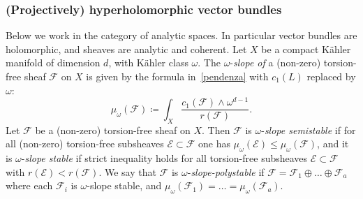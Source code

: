 \documentclass[11pt]{amsart}
\let\mathcal\mathscr
\def\cE{\mathcal{E}}
\def\cF{\mathcal{F}}
\theoremstyle{definition}
\theoremstyle{remark}
\begin{document}
\subsubsection{(Projectively) hyperholomorphic vector bundles}\label{subsubsec:iperolom}
%
Below we work in the category of analytic spaces. In particular vector bundles are holomorphic, and sheaves are analytic and coherent. 
Let $X$ be a compact K\"ahler  manifold of dimension $d$, with K\"ahler class $\omega$.  The $\omega$-\emph{slope of} a (non-zero) torsion-free sheaf 
$\cF$ on $X$
 is given by the formula in~\eqref{pendenza} with $c_1(L)$ replaced by $\omega$:
%
\begin{equation}
%
\mu_{\omega}(\cF)\coloneqq
\int_X\frac{c_1(\cF) \wedge \omega^{d-1}}{r(\cF)}.
%
\end{equation}
%
Let $\cF$ be a (non-zero) torsion-free sheaf 
 on $X$. Then $\cF$ is $\omega$-\emph{slope semistable} if for all (non-zero) torsion-free subsheaves $\cE\subset\cF$ one has 
$\mu_{\omega}(\cE)\le \mu_{\omega}(\cF)$, and it is $\omega$-\emph{slope stable} if strict inequality holds for all torsion-free subsheaves 
$\cE\subset\cF$ with $r(\cE)<r(\cF)$. We say that $\cF$ is $\omega$-\emph{slope-polystable} if $\cF=\cF_1\oplus\ldots\oplus \cF_a$ where each $\cF_i$ is $\omega$-slope stable, and $\mu_{\omega}(\cF_1)=\ldots=\mu_{\omega}(\cF_a)$. 
\end{document}
